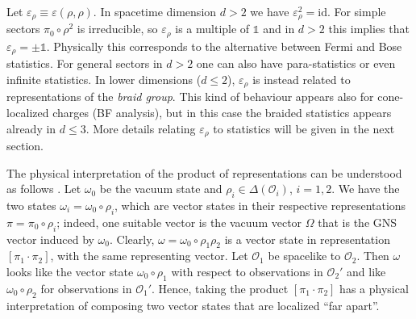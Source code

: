\documentclass[12pt,a4paper]{article}
\newcommand{\1}{\mathds{1}}                         %
\newcommand{\Ocal}{\mathcal{O}}
\newcommand{\id}{{\textrm{id}}}
\newtheorem{proposition}[theorem]{Proposition}
\begin{document}
Let $\varepsilon_\rho\equiv\varepsilon(\rho,\rho)$. In spacetime dimension $d>2$ we have $\varepsilon_\rho^2=\id$. For simple sectors $\pi_0\circ \rho^2$ is irreducible, so $\varepsilon_\rho$ is a multiple of $\1$ and in $d>2$ this implies that $\varepsilon_\rho=\pm \1$. Physically this corresponds to the alternative between Fermi and Bose statistics. For general sectors in $d>2$ one can also have para-statistics or even infinite statistics. In lower dimensions ($d\leq 2$), $\varepsilon_\rho$ is instead related to representations of the \emph{braid group}. This kind of behaviour appears also for cone-localized charges (BF analysis), but in this case the braided statistics appears already in $d\leq 3$. More details relating $\varepsilon_\rho$ to statistics will be given in the next section. 

The physical interpretation of the product of representations can be understood as follows \cite{DHR3}. Let $\omega_0$ be the vacuum state and $\rho_i\in\Delta(\Ocal_i)$, $i=1,2$. We have the two states $\omega_i=\omega_0\circ \rho_i$, which are vector states in their respective representations $\pi=\pi_0\circ \rho_i$; indeed, one suitable vector is the vacuum vector $\Omega$ that is the GNS vector induced by $\omega_0$. Clearly, $\omega=\omega_0\circ \rho_1\rho_2$ is a vector state in representation $[\pi_1\cdot \pi_2]$, with the same representing vector. Let
$\Ocal_1$ be spacelike to $\Ocal_2$. Then $\omega$
 looks like the vector state $\omega_0\circ\rho_1$ with respect to observations in $\Ocal_2'$ and like $\omega_0\circ\rho_2$ for observations in $\Ocal_1'$. Hence, taking the product $[\pi_1\cdot \pi_2]$ has a physical interpretation of composing two vector states that are localized ``far apart''.
\end{document}
